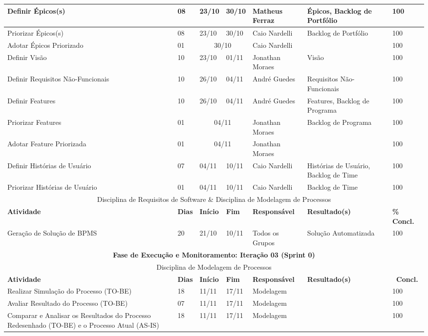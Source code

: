 \begin{center}
	\begin{tabular}{|m{6cm}|m{1cm}|m{1cm}|m{1cm}|m{4cm}|m{6cm}|m{2cm}|}
	\hline
	Definir Épicos(s) & 08 & 23/10 & 30/10 & Matheus Ferraz & Épicos, Backlog de Portfólio & 100 \\ \hline
	Priorizar Épicos(s) & 08 & 23/10 & 30/10 & Caio Nardelli & Backlog de Portfólio & 100 \\ \hline
	Adotar Épicos Priorizado & 01 & \multicolumn{2}{c|}{30/10} & Caio Nardelli & & 100 \\ \hline
	Definir Visão & 10 & 23/10 & 01/11 & Jonathan Moraes & Visão & 100 \\ \hline
	Definir Requisitos Não-Funcionais & 10 & 26/10 & 04/11 & André Guedes & Requisitos Não-Funcionais & 100 \\ \hline
	Definir Features & 10 & 26/10 & 04/11 & André Guedes & Features, Backlog de Programa & 100 \\ \hline
	Priorizar Features & 01 & \multicolumn{2}{c|}{04/11} & Jonathan Moraes & Backlog de Programa & 100 \\ \hline
	Adotar Feature Priorizada & 01 & \multicolumn{2}{c|}{04/11} & Jonathan Moraes & & 100 \\ \hline
	Definir Histórias de Usuário & 07 & 04/11 & 10/11 & Caio Nardelli & Histórias de Usuário, Backlog de Time & 100 \\ \hline
	Priorizar Histórias de Usuário & 01 & 04/11 & 10/11 & Caio Nardelli & Backlog de Time & 100 \\ \hline
	\multicolumn{7}{|c|}{Disciplina de Requisitos de Software \& Disciplina de Modelagem de Processos} \\ \hline
	\textbf{Atividade} & \textbf{Dias} & \textbf{Início} & \textbf{Fim} & \textbf{Responsável} & \textbf{Resultado(s)} & \textbf{\% Concl.} \\ \hline
	Geração de Solução de BPMS & 20 & 21/10 & 10/11 & Todos os Grupos & Solução Automatizada & 100 \\ \hline
	\multicolumn{7}{|c|}{\textbf{Fase de Execução e Monitoramento: Iteração 03 (Sprint 0)}} \\
	\hline
	\multicolumn{7}{|c|}{Disciplina de Modelagem de Processos} \\
	\hline
	\textbf{Atividade} & \textbf{Dias} & \textbf{Início} & \textbf{Fim} & \textbf{Responsável} & \textbf{Resultado(s)} & \textbf{\ Concl.} \\ \hline
	Realizar Simulação do Processo (TO-BE) & 18 & 11/11 & 17/11 & Modelagem & & 100 \\ \hline
	Avaliar Resultado do Processo (TO-BE) & 07 & 11/11 & 17/11 & Modelagem & & 100 \\ \hline
	Comparar e Analisar os Resultados do Processo Redesenhado (TO-BE) e o Processo Atual (AS-IS) & 18 & 11/11 & 17/11 & Modelagem & & 100 \\ \hline
	\end{tabular}
\end{center}
